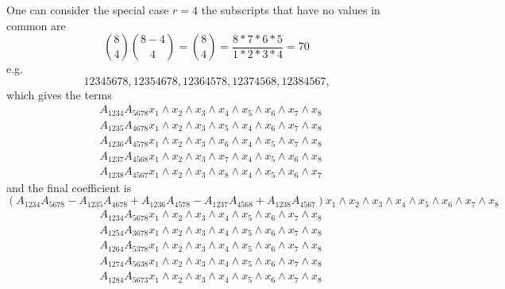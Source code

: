 \documentclass[aps, preprint]{revtex4}
\begin{document}
\begin{enumerate}
One can consider the special case $r =4$ the subscripts that have no values in common are
\begin{equation}\binom{8}{4} \binom{8 -4}{4} =\binom{8}{4} =\frac{8 \ast 7 \ast 6 \ast 5}{1 \ast 2 \ast 3 \ast 4} =70
\end{equation}e.g.
\begin{equation}12345678,12354678,12364578,12374568,12384567\text{,}
\end{equation}which gives the terms
\begin{align} & A_{1 2 3 4} A_{5 6 7 8} x_{1} \wedge x_{2} \wedge x_{3} \wedge x_{4} \wedge x_{5} \wedge x_{6} \wedge x_{7} \wedge x_{8} \nonumber  \\
 & A_{1 2 3 5} A_{4 6 7 8} x_{1} \wedge x_{2} \wedge x_{3} \wedge x_{5} \wedge x_{4} \wedge x_{6} \wedge x_{7} \wedge x_{8} \nonumber  \\
 & A_{1 2 3 6} A_{4 5 7 8} x_{1} \wedge x_{2} \wedge x_{3} \wedge x_{6} \wedge x_{4} \wedge x_{5} \wedge x_{7} \wedge x_{8} \nonumber  \\
 & A_{1 2 3 7} A_{4 5 6 8} x_{1} \wedge x_{2} \wedge x_{3} \wedge x_{7} \wedge x_{4} \wedge x_{5} \wedge x_{6} \wedge x_{8} \nonumber  \\
 & A_{1 2 3 8} A_{4 5 6 7} x_{1} \wedge x_{2} \wedge x_{3} \wedge x_{8} \wedge x_{4} \wedge x_{5} \wedge x_{6} \wedge x_{7}\end{align}and the final coefficient is
\begin{equation}\left (A_{1 2 3 4} A_{5 6 7 8} -A_{1 2 3 5} A_{4 6 7 8} +A_{1 2 3 6} A_{4 5 7 8} -A_{1 2 3 7} A_{4 5 6 8} +A_{1 2 3 8} A_{4 5 6 7}\right ) x_{1} \wedge x_{2} \wedge x_{3} \wedge x_{4} \wedge x_{5} \wedge x_{6} \wedge x_{7} \wedge x_{8}
\end{equation}
\begin{align} & A_{1 2 3 4} A_{5 6 7 8} x_{1} \wedge x_{2} \wedge x_{3} \wedge x_{4} \wedge x_{5} \wedge x_{6} \wedge x_{7} \wedge x_{8} \nonumber  \\
 & A_{1 2 5 4} A_{3 6 7 8} x_{1} \wedge x_{2} \wedge x_{3} \wedge x_{4} \wedge x_{5} \wedge x_{6} \wedge x_{7} \wedge x_{8} \nonumber  \\
 & A_{1 2 6 4} A_{5 3 7 8} x_{1} \wedge x_{2} \wedge x_{3} \wedge x_{4} \wedge x_{5} \wedge x_{6} \wedge x_{7} \wedge x_{8} \nonumber  \\
 & A_{1 2 7 4} A_{5 6 3 8} x_{1} \wedge x_{2} \wedge x_{3} \wedge x_{4} \wedge x_{5} \wedge x_{6} \wedge x_{7} \wedge x_{8} \nonumber  \\
 & A_{1 2 8 4} A_{5 6 7 3} x_{1} \wedge x_{2} \wedge x_{3} \wedge x_{4} \wedge x_{5} \wedge x_{6} \wedge x_{7} \wedge x_{8}\end{align}

\end{enumerate}
\end{document}
